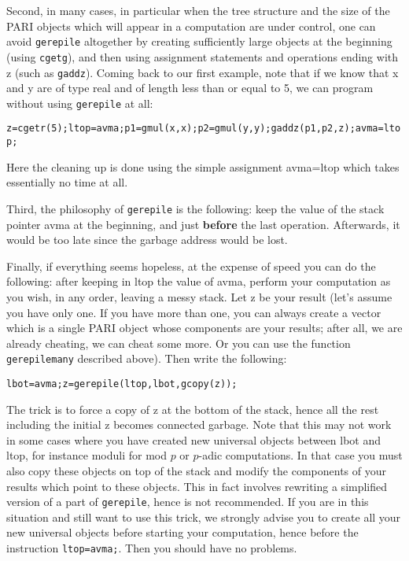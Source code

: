 Second, in many cases, in particular when the tree structure and the size
of the PARI objects which will appear in a computation are under control,
one can avoid {\tt gerepile} altogether by creating sufficiently large objects
at the beginning (using {\tt cgetg}), and then using assignment statements and
operations ending with z (such as {\tt gaddz}). Coming back to our first example,
note that if we know that x and y are of type real and of length less than or
equal to 5, we can program without using {\tt gerepile} at all:

{\tt z=cgetr(5);ltop=avma;p1=gmul(x,x);p2=gmul(y,y);gaddz(p1,p2,z);avma=ltop;}

Here the cleaning up is done using the simple assignment avma=ltop which
takes essentially no time at all.

Third, the philosophy of {\tt gerepile} is the following: keep the value of the
stack pointer avma at the beginning, and just {\bf before} the last operation.
Afterwards, it would be too late since the garbage address would be lost.

Finally, if everything seems hopeless, at the expense of speed you can do the
following: after keeping in ltop the value of avma, perform your computation
as you wish, in any order, leaving a messy stack. Let z be your result
(let's assume you have only one. If you have more than one, you can always create a
vector which is a single PARI object whose components are your results;
after all, we are already cheating, we can cheat some more. Or you can
use the function {\tt gerepilemany} described above).
Then write the following:

{\tt lbot=avma;z=gerepile(ltop,lbot,gcopy(z));}

The trick is to force a copy of z at the bottom of the stack, hence all the
rest including the initial z becomes connected garbage. Note that this
may not work in some cases where you have created new universal objects between
lbot and ltop, for instance moduli for mod $p$ or $p$-adic computations.
In that case you must also copy these objects on top of the
stack and modify the components of your results which point to these objects.
This in fact involves rewriting a simplified version of a part of {\tt gerepile}, hence
is not recommended. If you are in this situation and still want to use this trick,
we strongly advise you to create all your new universal objects before starting
your computation, hence before the instruction {\tt ltop=avma;}. Then you should
have no problems.

